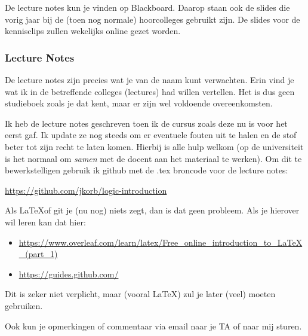 De lecture notes kun je vinden op Blackboard. Daarop staan ook de slides die vorig jaar bij de (toen nog normale) hoorcolleges gebruikt zijn. De slides voor de kennisclips zullen wekelijks online gezet worden.

\subsubsection*{Lecture Notes}

De lecture notes zijn precies wat je van de naam kunt verwachten. Erin vind je wat ik in de betreffende colleges (lectures) had willen vertellen. Het is dus geen studieboek zoals je dat kent, maar er zijn wel voldoende overeenkomsten.


Ik heb de lecture notes geschreven toen ik de cursus zoals deze nu is voor het eerst gaf. Ik update ze nog steeds om er eventuele fouten uit te halen en de stof beter tot zijn recht te laten komen. Hierbij is alle hulp welkom (op de universiteit is het normaal om \emph{samen} met de docent aan het materiaal te werken). Om dit te bewerkstelligen gebruik ik github met de .tex broncode voor de lecture notes:
\begin{center}
  \url{https://github.com/jkorb/logic-introduction}
\end{center}

Als \LaTeX of git je (nu nog) niets zegt, dan is dat geen probleem. Als je hierover wil leren kan dat hier:

\begin{itemize}
  \item \url{https://www.overleaf.com/learn/latex/Free_online_introduction_to_LaTeX_(part_1)}

  \item \url{https://guides.github.com/}
\end{itemize}

Dit is zeker niet verplicht, maar (vooral \LaTeX) zul je later (veel) moeten gebruiken.

Ook kun je opmerkingen of commentaar via email naar je TA of naar mij sturen.

